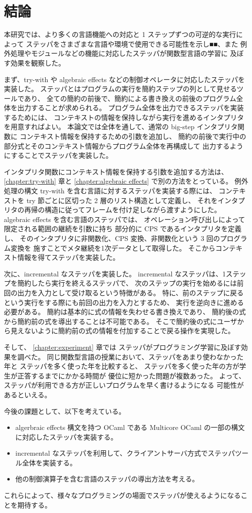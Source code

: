 \chapter{結論}
\label{chapter:conclusion}

本研究では、より多くの言語機能への対応と 1 ステップずつの可逆的な実行によって
ステッパをさまざまな言語や環境で使用できる可能性を示し■■、また
例外処理やモジュールなどの機能に対応したステッパが関数型言語の学習に
及ぼす効果を観察した。

まず、try-with や algebraic effects などの制御オペレータに対応したステッパを実装した。
ステッパとはプログラムの実行を簡約ステップの列として見せるツールであり、
全ての簡約の前後で、簡約による書き換えの前後のプログラム全体を出力することが求められる。
プログラム全体を出力できるステッパを実装するためには、
コンテキストの情報を保持しながら実行を進めるインタプリタを用意すればよい。
本論文では全体を通して、通常の big-step インタプリタ関数に
コンテキスト情報を保持するための引数を追加し、
簡約の前後で実行中の部分式とそのコンテキスト情報からプログラム全体を再構成して
出力するようにすることでステッパを実装した。

インタプリタ関数にコンテキスト情報を保持する引数を追加する方法は、
\ref{chapter:try-with} 章と \ref{chapter:algebraic effects}
で別の方法をとっている。
例外処理の構文 try-with を含む言語に対するステッパを実装する際には、
コンテキストを try 節ごとに区切った 2 層のリスト構造として定義し、
それをインタプリタの再帰の構造に従ってフレームを付け足しながら渡すようにした。
algebraic effects を含む言語のステッパでは、
オペレーション呼び出しによって限定される範囲の継続を引数に持ち
部分的に CPS であるインタプリタを定義し、
そのインタプリタに非関数化、CPS 変換、非関数化という 3 回のプログラム変換を
施すことでメタ継続を1次データとして取得した。
そこからコンテキスト情報を得てステッパを実装した。

次に、incremental なステッパを実装した。
incremental なステッパは、1ステップを簡約したら実行を終えるステッパで、
次のステップの実行を始めるには前回の出力を入力として受け取るという特徴がある。
特に、前のステップに戻るという実行をする際にも前回の出力を入力とするため、
実行を逆向きに進める必要がある。
簡約は基本的に式の情報を失わせる書き換えであり、
簡約後の式から簡約前の式を導出することは不可能である。
そこで簡約後の式にユーザから見えないように簡約前の式の情報を付加することで戻る操作を実現した。

そして、 \ref{chapter:experiment} 章では
ステッパがプログラミング学習に及ぼす効果を調べた。
同じ関数型言語の授業において、ステッパをあまり使わなかった年と
ステッパを多く使った年を比較すると、
ステッパを多く使った年の方が学生が正答するまでにかかる時間が
優位に短かった問題が複数あった。
よって、ステッパが利用できる方が正しいプログラムを早く書けるようになる
可能性があるといえる。

今後の課題として、以下を考えている。

\begin{itemize}
\item algerbraic effects 構文を持つ OCaml である Multicore OCaml の一部の構文に対応したステッパを実装する。
\item incremental なステッパを利用して、クライアントサーバ方式でステッパツール全体を実装する。
\item 他の制御演算子を含む言語のステッパの導出方法を考える。
\end{itemize}

\noindent これらによって、様々なプログラミングの場面でステッパが使えるようになることを期待する。
